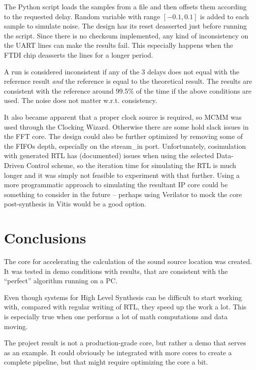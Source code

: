 \documentclass[a4paper,twocolumn]{article}
\begin{document}
The Python script loads the samples from a file and then offsets them
according to the requested delay.
Random variable with range $[-0.1,  0.1]$ is added to each sample to
simulate noise. The design has its reset deasserted just before
running the script. Since there is no checksum implemented, any kind
of inconsistency on the UART lines can make the results
fail. This especially happens when the FTDI chip deasserts the lines
for a longer period.

A run is considered inconsistent if any of the 3 delays does not equal
with the reference result \emph{and} the reference is equal to the
theoretical result. The results are consistent with the reference
around 99.5\% of the time if the above conditions are used. The noise
does not matter w.r.t. consistency.

It also became apparent that a proper clock source is required, so
MCMM was used through the Clocking Wizard. Otherwise there are some
hold slack issues in the FFT core.  The design could also be further
optimized by removing some of the FIFOs depth, especially on the
stream\_in port. Unfortunately, cosimulation with generated RTL has
(documented) issues when using the selected Data-Driven Control
scheme, so the iteration time for simulating the RTL is much longer
and it was simply not feasible to experiment with that further. Using
a more programmatic approach to simulating the resultant IP core could
be something to consider in the future -- perhaps using Verilator to
mock the core post-synthesis in Vitis would be a good option.

\section{Conclusions}

The core for accelerating the calculation of the sound source location
was created. It was tested in demo conditions with results, that are
consistent with the ``perfect'' algorithm running on a PC.

Even though systems for High Level Synthesis can be difficult to start
working with, compared with regular writing of RTL, they speed up the
work a lot. This is especially true when one performs a lot of math
computations and data moving.

The project result is not a production-grade core, but rather a demo
that serves as an example. It could obviously be integrated with more
cores to create a complete pipeline, but that might require optimizing
the core a bit.
\end{document}
